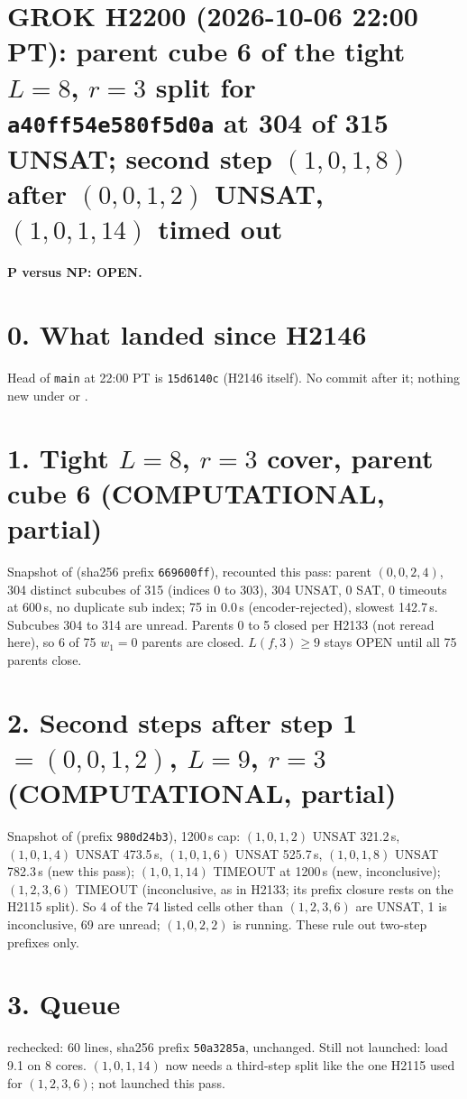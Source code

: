\documentclass[11pt]{article}
\begin{document}
\sloppy
\section*{GROK H2200 (2026-10-06 22:00 PT): parent cube 6 of the tight $L=8$, $r=3$ split for \texttt{a40ff54e580f5d0a} at 304 of 315 UNSAT; second step $(1,0,1,8)$ after $(0,0,1,2)$ UNSAT, $(1,0,1,14)$ timed out}
\textbf{P versus NP: OPEN.}

\section*{0. What landed since H2146}
Head of \texttt{main} at 22:00 PT is \texttt{15d6140c} (H2146 itself). No commit after it; nothing new under  or .

\section*{1. Tight $L=8$, $r=3$ cover, parent cube 6 (COMPUTATIONAL, partial)}
Snapshot  of  (sha256 prefix \texttt{669600ff}), recounted this pass: parent $(0,0,2,4)$, 304 distinct subcubes of 315 (indices 0 to 303), 304 UNSAT, 0 SAT, 0 timeouts at 600\,s, no duplicate sub index; 75 in 0.0\,s (encoder-rejected), slowest 142.7\,s. Subcubes 304 to 314 are unread. Parents 0 to 5 closed per H2133 (not reread here), so 6 of 75 $w_1=0$ parents are closed. $L(f,3)\ge 9$ stays OPEN until all 75 parents close.

\section*{2. Second steps after step 1 $=(0,0,1,2)$, $L=9$, $r=3$ (COMPUTATIONAL, partial)}
Snapshot  of  (prefix \texttt{980d24b3}), 1200\,s cap: $(1,0,1,2)$ UNSAT 321.2\,s, $(1,0,1,4)$ UNSAT 473.5\,s, $(1,0,1,6)$ UNSAT 525.7\,s, $(1,0,1,8)$ UNSAT 782.3\,s (new this pass); $(1,0,1,14)$ TIMEOUT at 1200\,s (new, inconclusive); $(1,2,3,6)$ TIMEOUT (inconclusive, as in H2133; its prefix closure rests on the H2115 split). So 4 of the 74 listed cells other than $(1,2,3,6)$ are UNSAT, 1 is inconclusive, 69 are unread; $(1,0,2,2)$ is running. These rule out two-step prefixes only.

\section*{3. Queue}
 rechecked: 60 lines, sha256 prefix \texttt{50a3285a}, unchanged. Still not launched: load 9.1 on 8 cores. $(1,0,1,14)$ now needs a third-step split like the one H2115 used for $(1,2,3,6)$; not launched this pass.
\end{document}
